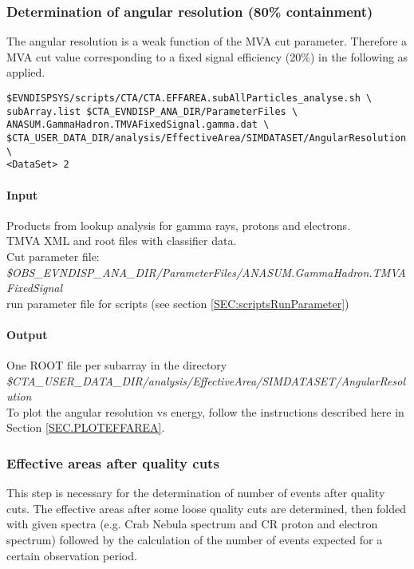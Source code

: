 \documentclass[titlepage,a4paper,twoside,11pt]{report}
\begin{document}
\subsubsection{Determination of angular resolution (80\% containment)} 

The angular resolution is a weak function of the MVA cut parameter. 
Therefore a MVA cut value corresponding to a fixed signal efficiency (20\%) 
in the following as applied.

\begin{lstlisting}
$EVNDISPSYS/scripts/CTA/CTA.EFFAREA.subAllParticles_analyse.sh \
subArray.list $CTA_EVNDISP_ANA_DIR/ParameterFiles \
ANASUM.GammaHadron.TMVAFixedSignal.gamma.dat \
$CTA_USER_DATA_DIR/analysis/EffectiveArea/SIMDATASET/AngularResolution \
<DataSet> 2
\end{lstlisting}

\paragraph{Input}
Products from lookup analysis for gamma rays, protons and electrons. \\
TMVA XML and root files with classifier data. \\
Cut parameter file: \\
{\it \$OBS\_EVNDISP\_ANA\_DIR/ParameterFiles/ANASUM.GammaHadron.TMVAFixedSignal}\\
run parameter file for scripts (see section \ref{SEC:scriptsRunParameter})

\paragraph{Output}

One ROOT file per subarray in the directory  \\
{\it \$CTA\_USER\_DATA\_DIR/analysis/EffectiveArea/SIMDATASET/AngularResolution} \\
To plot the angular resolution vs energy, follow the instructions described here in Section \ref{SEC.PLOTEFFAREA}.

\subsubsection{Effective areas after quality cuts}

This step is necessary for the determination of number of events after quality cuts. 
The effective areas after some loose quality cuts are determined, then folded with given spectra (e.g. Crab Nebula spectrum and CR proton and electron spectrum) followed by the calculation of the number of events expected for a certain observation period.
\end{document}

